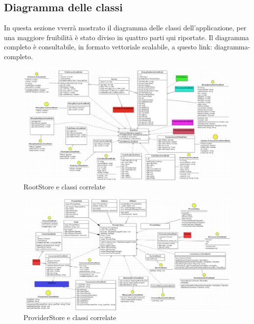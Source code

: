 \subsection{Diagramma delle classi}

In questa sezione vverrà mostrato il diagramma delle classi dell'applicazione, 
per una maggiore fruibilità è stato diviso in quattro parti qui riportate.
Il diagramma completo è consultabile, in formato vettoriale scalabile, a questo link: diagramma-completo. %

\begin{landscape}
\begin{figure}[H]
    \begin{center}
    \includegraphics[scale=0.7]{immagini/rootstore.png}
    \caption{RootStore e classi correlate}
    \end{center}
\end{figure}
\end{landscape}

\begin{landscape}
    \begin{figure}[H]
        \begin{center}
        \includegraphics[scale=0.7]{immagini/providerstore.png}
        \caption{ProviderStore e classi correlate}
        \end{center}
    \end{figure}
\end{landscape}

